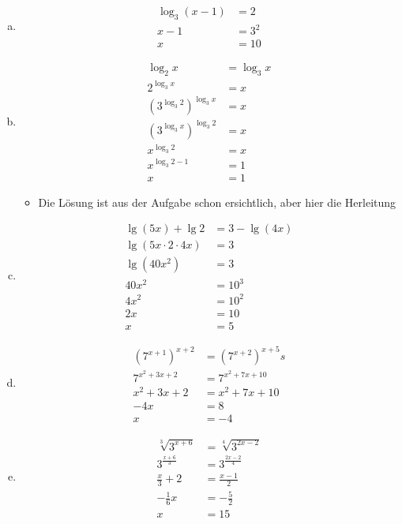 \documentclass{standalone}
\begin{document}
\begin{enumerate}[a)]
    \item \begin{align}
        \log_3 (x-1) &= 2 \\
        x-1 &= 3^2 \\
        x &= 10
    \end{align}
    \item \begin{align}
        \log_2 x &= \log_3 x \\
        2^{\log_3 x} &= x \\
        (3^{\log_3 2})^{\log_3 x} &= x \\
        (3^{\log_3 x})^{\log_3 2} &= x \\
        x^{\log_3 2} &= x \\
        x^{\log_3 2 - 1} &= 1 \\
        x &= 1
    \end{align}
    \begin{itemize}
        \item Die Lösung ist aus der Aufgabe schon ersichtlich, aber hier die Herleitung
    \end{itemize}
    \item \begin{align}
        \lg(5x) + \lg 2 &= 3 - \lg(4x) \\
        \lg(5x \cdot 2 \cdot 4x) &= 3 \\
        \lg(40x^2) &= 3 \\
        40x^2 &= 10^3 \\
        4x^2 &= 10^2 \\
        2x &= 10 \\
        x &= 5
    \end{align}
    \item \begin{align}
        (7^{x+1})^{x+2} &= (7^{x+2})^{x+5}s \\
        7^{x^2+3x+2} &= 7^{x^2+7x+10} \\
        x^2 + 3x + 2 &= x^2+7x+10 \\
        -4x &= 8 \\
        x &= -4
    \end{align}
    \item \begin{align}
        \sqrt[3]{3^{x+6}} &= \sqrt[4]{3^{2x-2}} \\
        3^{\frac{x+6}{3}} &= 3^{\frac{2x-2}{4}} \\
        \frac{x}{3} + 2 &= \frac{x-1}{2} \\
        -\frac{1}{6}x &= -\frac{5}{2} \\
        x &= 15
    \end{align}
\end{enumerate}
\end{document}
